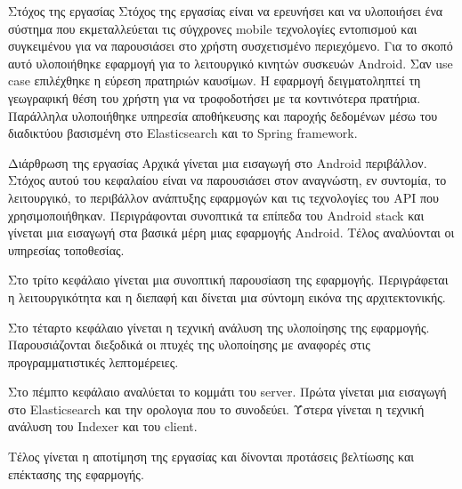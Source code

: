 \begin{section}{Στόχος της εργασίας}
\bigskip
Στόχος της εργασίας είναι να ερευνήσει και να υλοποιήσει ένα σύστημα που εκμεταλλεύεται τις σύγχρονες mobile τεχνολογίες εντοπισμού και συγκειμένου για να παρουσιάσει στο χρήστη συσχετισμένο περιεχόμενο. Για το σκοπό αυτό υλοποιήθηκε εφαρμογή για το λειτουργικό κινητών συσκευών Android. Σαν use case επιλέχθηκε η εύρεση πρατηριών καυσίμων. Η εφαρμογή δειγματοληπτεί τη γεωγραφική θέση του χρήστη για να τροφοδοτήσει με τα κοντινότερα πρατήρια. Παράλληλα υλοποιήθηκε υπηρεσία αποθήκευσης και παροχής δεδομένων μέσω του διαδικτύου βασισμένη στο Elasticsearch και το Spring framework.

\end{section}


\begin{section}{Διάρθρωση της εργασίας}
\bigskip
Αρχικά γίνεται μια εισαγωγή στο Android περιβάλλον. Στόχος αυτού του κεφαλαίου είναι να παρουσιάσει στον αναγνώστη, εν συντομία, το λειτουργικό, το περιβάλλον ανάπτυξης εφαρμογών και τις τεχνολογίες του API που χρησιμοποιήθηκαν. Περιγράφονται συνοπτικά τα επίπεδα του Android stack και γίνεται μια εισαγωγή στα βασικά μέρη μιας εφαρμογής Android. Τέλος αναλύονται οι υπηρεσίας τοποθεσίας.
\par
Στο τρίτο κεφάλαιο γίνεται μια συνοπτική παρουσίαση της εφαρμογής. Περιγράφεται η λειτουργικότητα και η διεπαφή και δίνεται μια σύντομη εικόνα της αρχιτεκτονικής.
\par
Στο τέταρτο κεφάλαιο γίνεται η τεχνική ανάλυση της υλοποίησης της εφαρμογής. Παρουσιάζονται διεξοδικά οι πτυχές της υλοποίησης με αναφορές στις προγραμματιστικές λεπτομέρειες.
\par
Στο πέμπτο κεφάλαιο αναλύεται το κομμάτι του server. Πρώτα γίνεται μια εισαγωγή στο Elasticsearch και την ορολογια που το συνοδεύει. Ύστερα γίνεται η τεχνική ανάλυση του Indexer και του client.
\par
Τέλος γίνεται η αποτίμηση της εργασίας και δίνονται προτάσεις βελτίωσης και επέκτασης της εφαρμογής.

\end{section}


